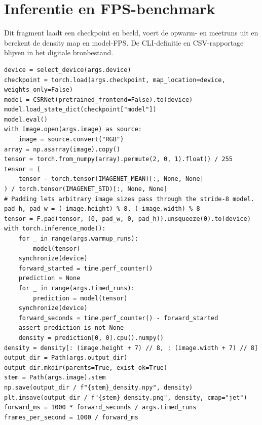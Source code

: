 \clearpage
\section{Inferentie en FPS-benchmark}
Dit fragment laadt een checkpoint en beeld, voert de opwarm- en meetruns uit en berekent de density map en model-FPS. De CLI-definitie en CSV-rapportage blijven in het digitale bronbestand.
\begin{verbatim}
device = select_device(args.device)
checkpoint = torch.load(args.checkpoint, map_location=device, weights_only=False)
model = CSRNet(pretrained_frontend=False).to(device)
model.load_state_dict(checkpoint["model"])
model.eval()
with Image.open(args.image) as source:
    image = source.convert("RGB")
array = np.asarray(image).copy()
tensor = torch.from_numpy(array).permute(2, 0, 1).float() / 255
tensor = (
    tensor - torch.tensor(IMAGENET_MEAN)[:, None, None]
) / torch.tensor(IMAGENET_STD)[:, None, None]
# Padding lets arbitrary image sizes pass through the stride-8 model.
pad_h, pad_w = (-image.height) % 8, (-image.width) % 8
tensor = F.pad(tensor, (0, pad_w, 0, pad_h)).unsqueeze(0).to(device)
with torch.inference_mode():
    for _ in range(args.warmup_runs):
        model(tensor)
    synchronize(device)
    forward_started = time.perf_counter()
    prediction = None
    for _ in range(args.timed_runs):
        prediction = model(tensor)
    synchronize(device)
    forward_seconds = time.perf_counter() - forward_started
    assert prediction is not None
    density = prediction[0, 0].cpu().numpy()
density = density[: (image.height + 7) // 8, : (image.width + 7) // 8]
output_dir = Path(args.output_dir)
output_dir.mkdir(parents=True, exist_ok=True)
stem = Path(args.image).stem
np.save(output_dir / f"{stem}_density.npy", density)
plt.imsave(output_dir / f"{stem}_density.png", density, cmap="jet")
forward_ms = 1000 * forward_seconds / args.timed_runs
frames_per_second = 1000 / forward_ms
\end{verbatim}
